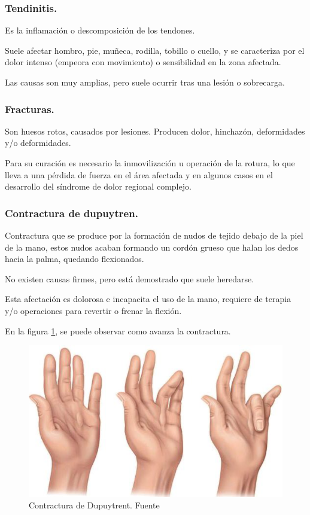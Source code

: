 \subsubsection{Tendinitis.}
Es la inflamación o descomposición de los tendones.

Suele afectar hombro, pie, muñeca, rodilla, tobillo o cuello, y se caracteriza por el dolor intenso (empeora con movimiento) o sensibilidad en la zona afectada. 

Las causas son muy amplias, pero suele ocurrir tras una lesión o sobrecarga.
\subsubsection{Fracturas.}

Son huesos rotos, causados por lesiones. Producen dolor, hinchazón, deformidades y/o deformidades.

Para su curación es necesario la inmovilización u operación de la rotura, lo que lleva a una pérdida de fuerza en el área afectada y en algunos casos en el desarrollo del síndrome de dolor regional complejo.
\subsubsection{Contractura de dupuytren.}
Contractura que se produce por la formación de nudos de tejido debajo de la piel de la mano, estos nudos acaban formando un cordón grueso que halan los dedos hacia la palma, quedando flexionados. 

No existen causas firmes, pero está demostrado que suele heredarse. 

Esta afectación es dolorosa e incapacita el uso de la mano, requiere de terapia y/o operaciones para revertir o frenar la flexión. 

En la figura \ref{fig:Dupuytrent}, se puede observar como avanza la contractura.

\begin{figure}
    \centering
    \includegraphics[width=0.5\linewidth]{img/Dupuytrent.png}
    \caption{Contractura de Dupuytrent. Fuente}
    \label{fig:Dupuytrent}
\end{figure}

